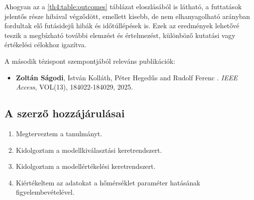 \documentclass[12pt,a4paper]{extarticle}
\begin{document}

Ahogyan az a \ref{th4:table:outcomes} táblázat eloszlásából is látható, a futtatások jelentős része hibával végződött, emellett kisebb, de nem elhanyagolható arányban fordultak elő futásidejű hibák és időtúllépések is.
Ezek az eredmények lehetővé teszik a megbízható további elemzést és értelmezést, különböző kutatási vagy értékelési célokhoz igazítva.

\vspace{2em}
A második tézispont szempontjából releváns publikációk:
\begin{itemize}
	\item \textbf{Zoltán Ságodi}, István Kolláth, Péter Heged\H{u}s and Rudolf Ferenc
	.
	\newblock \emph{IEEE Access}, VOL(13), 184022-184029, 2025.
\end{itemize}

\subsection*{A szerző hozzájárulásai}

%


\begin{enumerate}[wide = 0pt, widest = {II/5.}, leftmargin =*]
	
	\item[II/1.] Megterveztem a tanulmányt.
	
	\item[II/2.] Kidolgoztam a modellkiválasztási keretrendszert.
	
	\item[II/3.] Kidolgoztam a modellértékelési keretrendszert.
	
	\item[II/4.] Kiértékeltem az adatokat a hőmérséklet paraméter hatásának figyelembevételével.
	
\end{enumerate}



\end{document}
